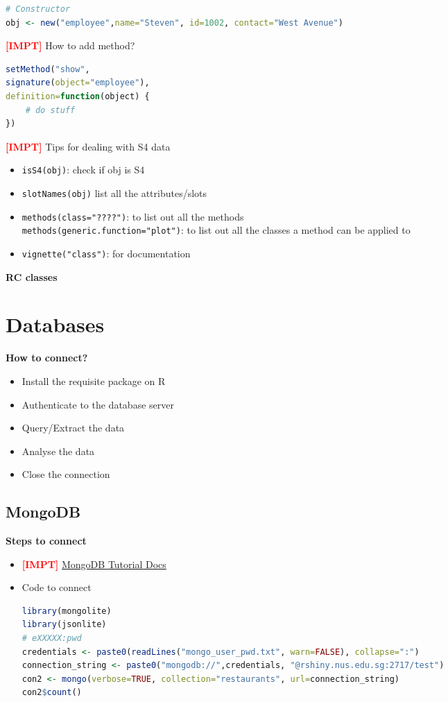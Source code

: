 \documentclass{article}
\newcommand{\impt}[0]{\textcolor{red}{\textbf{[IMPT] }}}
\begin{document}
\begin{multicols}{2}
\begin{lstlisting}[language=R]
# Constructor
obj <- new("employee",name="Steven", id=1002, contact="West Avenue")
\end{lstlisting}

\impt How to add method?
\begin{lstlisting}[language=R]
setMethod("show",
signature(object="employee"),
definition=function(object) {
	# do stuff
})
\end{lstlisting}

\impt Tips for dealing with S4 data
\begin{itemize}
	\item \texttt{isS4(obj)}: check if obj is S4
	\item \texttt{slotNames(obj)} list all the attributes/slots
	\item \texttt{methods(class="????")}: to list out all the methods\\
	\texttt{methods(generic.function="plot")}: to list out all the classes a method can be applied to
	\item \texttt{vignette("class")}: for documentation
\end{itemize}
\textbf{RC classes}
\section{Databases}
\textbf{How to connect?}
\begin{itemize}
	\item Install the requisite package on R
	\item Authenticate to the database server
	\item Query/Extract the data
	\item Analyse the data
	\item Close the connection
\end{itemize}
\subsection{MongoDB}
\textbf{Steps to connect}
\begin{itemize}
	\item \impt \href{https://www.mongodb.com/docs/v5.0/tutorial/getting-started}{MongoDB Tutorial Docs}
	\item Code to connect
	\begin{lstlisting}[language=R]
library(mongolite)
library(jsonlite)
# eXXXXX:pwd
credentials <- paste0(readLines("mongo_user_pwd.txt", warn=FALSE), collapse=":")
connection_string <- paste0("mongodb://",credentials, "@rshiny.nus.edu.sg:2717/test")
con2 <- mongo(verbose=TRUE, collection="restaurants", url=connection_string)
con2$count()
	\end{lstlisting}
\end{itemize}


\end{multicols}
\end{document}
